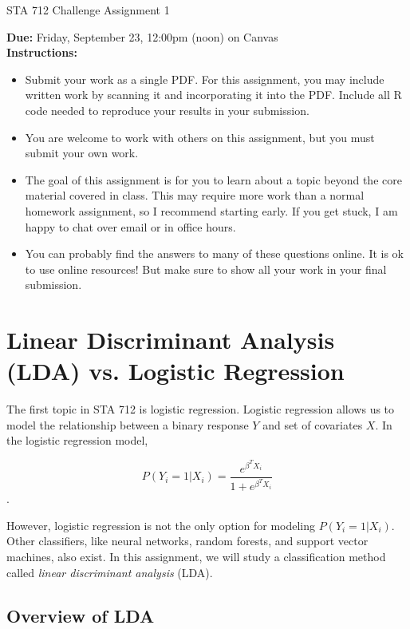 \documentclass[11pt]{article}
\begin{document}
\begin{center}
\Large
STA 712 Challenge Assignment 1\\
\normalsize
\vspace{5mm}
\end{center}

\noindent \textbf{Due:} Friday, September 23, 12:00pm (noon) on Canvas\\ 

\noindent \textbf{Instructions:} 
\begin{itemize}
\item Submit your work as a single PDF. For this assignment, you may include written work by scanning it and incorporating it into the PDF. Include all R code needed to reproduce your results in your submission.
\item You are welcome to work with others on this assignment, but you must submit your own work.
\item The goal of this assignment is for you to learn about a topic beyond the core material covered in class. This may require more work than a normal homework assignment, so I recommend starting early. If you get stuck, I am happy to chat over email or in office hours.
\item You can probably find the answers to many of these questions online. It is ok to use online resources! But make sure to show all your work in your final submission.
\end{itemize}

\section*{Linear Discriminant Analysis (LDA) vs. Logistic Regression}

The first topic in STA 712 is logistic regression. Logistic regression allows us to model the relationship between a binary response $Y$ and set of covariates $X$. In the logistic regression model,

$$P(Y_i = 1 | X_i) = \dfrac{e^{\beta^T X_i}}{1 + e^{\beta^T X_i}}$$.

\noindent However, logistic regression is not the only option for modeling $P(Y_i = 1 | X_i)$. Other classifiers, like neural networks, random forests, and support vector machines, also exist. In this assignment, we will study a classification method called \textit{linear discriminant analysis} (LDA).

\subsection*{Overview of LDA}
\end{document}
